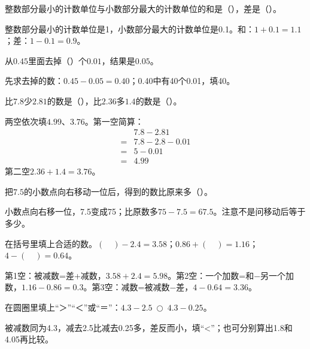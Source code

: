 整数部分最小的计数单位与小数部分最大的计数单位的和是（\hspace{1.8em}），差是（\hspace{1.8em}）。\par
\begin{BookAnswer}
整数部分最小的计数单位是1，小数部分最大的计数单位是0.1。和：\(1+0.1=1.1\)；差：\(1-0.1=0.9\)。
\end{BookAnswer}

从\(0.45\)里面去掉（\hspace{1.8em}）个\(0.01\)，结果是\(0.05\)。\par
\begin{BookAnswer}
先求去掉的数：\(0.45-0.05=0.40\)；0.40中有40个0.01，填40。
\end{BookAnswer}

比\(7.8\)少\(2.81\)的数是（\hspace{1.8em}），比\(2.36\)多\(1.4\)的数是（\hspace{1.8em}）。\par
\begin{BookAnswer}
两空依次填\(4.99\)、\(3.76\)。第一空简算：\[\begin{aligned}&7.8-2.81\\={}&7.8-2.8-0.01\\={}&5-0.01\\={}&4.99\end{aligned}\]第二空\(2.36+1.4=3.76\)。
\end{BookAnswer}

把\(7.5\)的小数点向右移动一位后，得到的数比原来多（\hspace{1.8em}）。\par
\begin{BookAnswer}
小数点向右移一位，7.5变成75；比原数多\(75-7.5=67.5\)。注意不是问移动后等于多少。
\end{BookAnswer}

在括号里填上合适的数。\((\quad)-2.4=3.58\)；\allowbreak{}\(0.86+(\quad)=1.16\)；\allowbreak{}\(4-(\quad)=0.64\)。\par
\begin{BookAnswer}
第1空：被减数=差+减数，\allowbreak{}\(3.58+2.4=5.98\)。第2空：一个加数=和−另一个加数，\allowbreak{}\(1.16-0.86=0.3\)。第3空：减数=被减数−差，\allowbreak{}\(4-0.64=3.36\)。
\end{BookAnswer}

在圆圈里填上“＞”“＜”或“＝”：\(4.3-2.5\ \bigcirc\ 4.3-0.25\)。\par
\begin{BookAnswer}
被减数同为4.3，减去2.5比减去0.25多，差反而小，填“<”；也可分别算出1.8和4.05再比较。
\end{BookAnswer}

